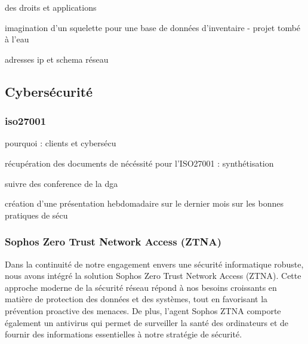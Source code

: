 des droits et applications

imagination d'un squelette pour une base de données d'inventaire - projet tombé à l'eau

adresses ip et schema réseau

\subsection{Cybersécurité}
\subsubsection{iso27001}
pourquoi : clients et cybersécu

récupération des documents de nécéssité pour l'ISO27001 : synthétisation

suivre des conference de la dga

création d'une présentation hebdomadaire sur le dernier mois sur les bonnes pratiques de sécu

\subsubsection{Sophos Zero Trust Network Access (ZTNA)}

Dans la continuité de notre engagement envers une sécurité informatique robuste, nous avons intégré la solution Sophos Zero Trust Network Access (ZTNA).
Cette approche moderne de la sécurité réseau répond à nos besoins croissants en matière de protection des données et des systèmes, tout en favorisant la prévention proactive des menaces.
De plus, l'agent Sophos ZTNA comporte également un antivirus qui permet de surveiller la santé des ordinateurs et de fournir des informations essentielles à notre stratégie de sécurité.

